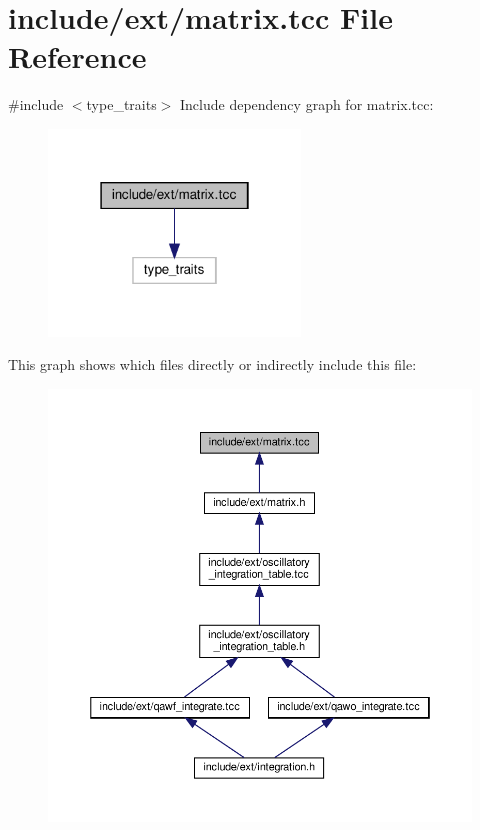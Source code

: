 \hypertarget{matrix_8tcc}{}\section{include/ext/matrix.tcc File Reference}
\label{matrix_8tcc}
{\ttfamily \#include $<$type\+\_\+traits$>$}\newline
Include dependency graph for matrix.\+tcc\+:
\nopagebreak
\begin{figure}[H]
\begin{center}
\leavevmode
\includegraphics[width=190pt]{matrix_8tcc__incl}
\end{center}
\end{figure}
This graph shows which files directly or indirectly include this file\+:
\nopagebreak
\begin{figure}[H]
\begin{center}
\leavevmode
\includegraphics[width=350pt]{matrix_8tcc__dep__incl}
\end{center}
\end{figure}
